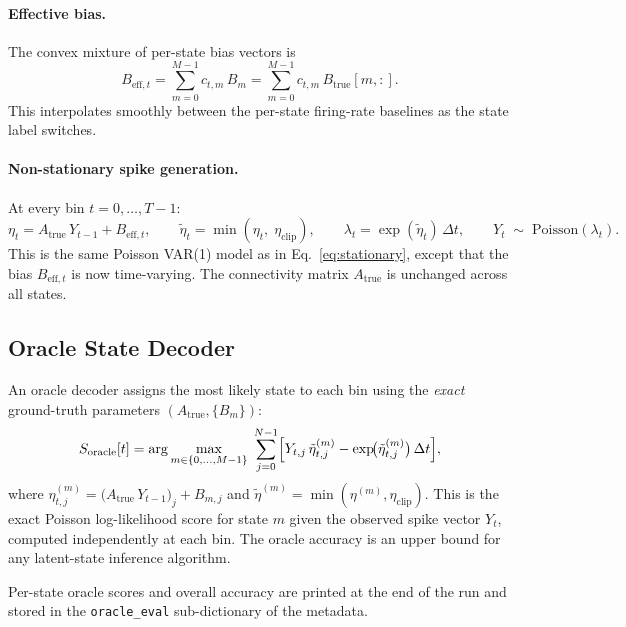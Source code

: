 \documentclass[11pt]{article}
\begin{document}
\paragraph{Effective bias.}
The convex mixture of per-state bias vectors is
\begin{equation}
  B_{\mathrm{eff},t}
  = \sum_{m=0}^{M-1} c_{t,m}\, B_m
  = \sum_{m=0}^{M-1} c_{t,m}\, B_{\text{true}}[m,:].
  \label{eq:Beff}
\end{equation}
This interpolates smoothly between the per-state firing-rate
baselines as the state label switches.

\paragraph{Non-stationary spike generation.}
At every bin $t = 0, \dots, T-1$:
\begin{equation}
  \eta_t = A_{\text{true}}\,Y_{t-1} + B_{\mathrm{eff},t},
  \qquad
  \tilde{\eta}_t = \min(\eta_t,\;\eta_{\mathrm{clip}}),
  \qquad
  \lambda_t = \exp(\tilde{\eta}_t)\,\Delta t,
  \qquad
  Y_t \;\sim\; \mathrm{Poisson}(\lambda_t).
  \label{eq:nonstat}
\end{equation}
This is the same Poisson VAR(1) model as in Eq.~\eqref{eq:stationary},
except that the bias $B_{\mathrm{eff},t}$ is now time-varying.
The connectivity matrix $A_{\text{true}}$ is unchanged across all states.

\subsection{Oracle State Decoder}
\label{sec:oracle}

An oracle decoder assigns the most likely state to each bin using
the \emph{exact} ground-truth parameters $(A_{\text{true}}, \{B_m\})$:
\begin{equation}
  S_{\text{oracle}}[t]
  = \arg\max_{m \in \{0,\dots,M-1\}}\;
    \sum_{j=0}^{N-1}
    \Bigl[
      Y_{t,j}\,\tilde{\eta}_{t,j}^{(m)}
      - \exp\!\bigl(\tilde{\eta}_{t,j}^{(m)}\bigr)\,\Delta t
    \Bigr],
  \label{eq:oracle}
\end{equation}
where
$\eta_{t,j}^{(m)} = \bigl(A_{\text{true}}\,Y_{t-1}\bigr)_j + B_{m,j}$
and $\tilde{\eta}^{(m)} = \min(\eta^{(m)}, \eta_{\mathrm{clip}})$.
This is the exact Poisson log-likelihood score for state $m$ given
the observed spike vector $Y_t$, computed independently at each bin.
The oracle accuracy is an upper bound for any latent-state inference
algorithm.

Per-state oracle scores and overall accuracy are printed at the end of
the run and stored in the \texttt{oracle\_eval} sub-dictionary of the
metadata.
\end{document}
